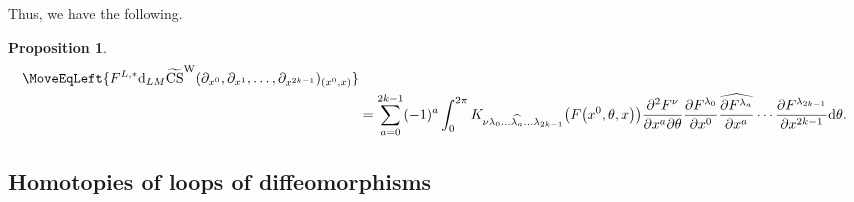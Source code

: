 \documentclass[pdftex]{sigma}
\numberwithin{equation}{section}
\newtheorem{Proposition}[Theorem]{Proposition}
\theoremstyle{definition}
\newcommand{\bm}{ M}
\newcommand{\ocs}{\widetilde{{\rm CS}}}
\begin{document}
Thus, we have the following.

\begin{Proposition}%
\begin{align}
\MoveEqLeft{F^{L,*} {\rm d}_{L{\bm}} \ocs^{\rm W}
(\partial_{x^0}, \partial_{x^1},
\dots, \partial_{x^{2k-1}})_{(x^0,x)}}\nonumber\\
&=
\sum_{a=0}^{2k-1} (-1)^a
\int_0^{2\pi}
K_{\nu \lambda_0 \dots \widehat{\lambda_a} \dots \lambda_{2k-1}}
\bigl(F\bigl(x^0, \theta , x\bigr)\bigr)
\frac{\partial^2 F^\nu}{\partial x^a \partial \theta}
\frac{\partial F^{\lambda_0}}{\partial x^0}
\widehat{\frac{\partial F^{\lambda_a}}{\partial x^a}}
\cdots
\frac{\partial F^{\lambda_{2k-1}}}{\partial x^{2k-1}}
 {\rm d}\theta.\!\!\!\label{eq:four}
\end{align}
\end{Proposition}

\subsection{Homotopies of loops of diffeomorphisms}%
\end{document}
